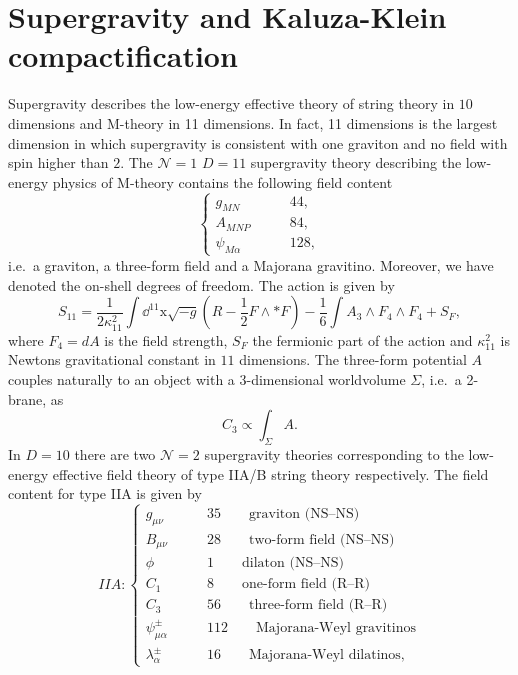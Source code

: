 \section{Supergravity and Kaluza-Klein compactification\label{sec:Supergravity}}
Supergravity describes the low-energy effective theory of string theory in $10$ dimensions and M-theory in 11 dimensions. In fact, 11 dimensions is the largest dimension in which supergravity is consistent with one graviton and no field with spin higher than $2$. The $\mathcal{N}=1$ $D=11$ supergravity theory describing the low-energy physics of M-theory contains the following field content 
\begin{equation}
    \begin{cases}
        g_{MN} \qquad &44,\\
        A_{MNP} \qquad &84,\\
        \psi_{M\alpha} \qquad &128,
    \end{cases}
\end{equation}
i.e.\ a graviton, a three-form field and a Majorana gravitino. Moreover, we have denoted the on-shell degrees of freedom. The action is given by 
\begin{equation}
    S_{11} = \frac{1}{2\kappa_{11}^2}\int\dd^{11}\mathrm{x}\sqrt{-g}\left(R-\frac{1}{2}F\wedge *F\right)-\frac{1}{6}\int A_3 \wedge F_{4}\wedge F_{4}+S_F, 
\end{equation}
where $F_{4}=dA$ is the field strength, $S_F$ the fermionic part of the action and $\kappa_{11}^2$ is Newtons gravitational constant in $11$ dimensions. The three-form potential $A$ couples naturally to an object with a 3-dimensional worldvolume $\Sigma$, i.e.\ a 2-brane, as 
\begin{equation}
    C_3 \propto \int_{\Sigma}A.
\end{equation}
In $D=10$ there are two $\mathcal{N}=2$ supergravity theories corresponding to the low-energy effective field theory of type IIA/B string theory respectively. The field content for type IIA is given by 
\begin{equation*}
    IIA: \begin{cases}
                g_{\mu\nu} \qquad &35 \qquad \text{graviton (NS--NS)}\\
                B_{\mu\nu} \qquad &28 \qquad  \text{two-form field (NS--NS)}\\
                \phi\qquad &1 \qquad  \text{dilaton (NS--NS)}\\
                C_{1}\qquad &8 \qquad  \text{one-form field (R--R)}\\
                C_{3}\qquad &56 \qquad  \text{three-form field  (R--R)}\\
                \psi_{\mu\alpha}^\pm\qquad &112\qquad \text{Majorana-Weyl gravitinos}\\
                \lambda_\alpha^\pm \qquad &16\qquad \text{Majorana-Weyl dilatinos},
          \end{cases}
\end{equation*}
